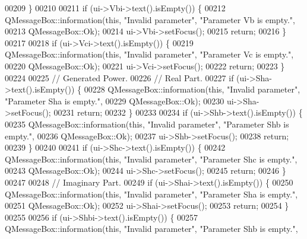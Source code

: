 \begin{DoxyCode}
00209   \}
00210 
00211   \textcolor{keywordflow}{if} (ui->Vbi->text().isEmpty()) \{
00212     QMessageBox::information(\textcolor{keyword}{this}, \textcolor{stringliteral}{"Invalid parameter"}, \textcolor{stringliteral}{"Parameter Vb is empty."},
00213                              QMessageBox::Ok);
00214     ui->Vbi->setFocus();
00215     \textcolor{keywordflow}{return};
00216   \}
00217 
00218   \textcolor{keywordflow}{if} (ui->Vci->text().isEmpty()) \{
00219     QMessageBox::information(\textcolor{keyword}{this}, \textcolor{stringliteral}{"Invalid parameter"}, \textcolor{stringliteral}{"Parameter Vc is empty."},
00220                              QMessageBox::Ok);
00221     ui->Vci->setFocus();
00222     \textcolor{keywordflow}{return};
00223   \}
00224 
00225   \textcolor{comment}{// Generated Power.}
00226   \textcolor{comment}{// Real Part.}
00227   \textcolor{keywordflow}{if} (ui->Sha->text().isEmpty()) \{
00228     QMessageBox::information(\textcolor{keyword}{this}, \textcolor{stringliteral}{"Invalid parameter"}, \textcolor{stringliteral}{"Parameter Sha is empty."},
00229                              QMessageBox::Ok);
00230     ui->Sha->setFocus();
00231     \textcolor{keywordflow}{return};
00232   \}
00233 
00234   \textcolor{keywordflow}{if} (ui->Shb->text().isEmpty()) \{
00235     QMessageBox::information(\textcolor{keyword}{this}, \textcolor{stringliteral}{"Invalid parameter"}, \textcolor{stringliteral}{"Parameter Shb is empty."},
00236                              QMessageBox::Ok);
00237     ui->Shb->setFocus();
00238     \textcolor{keywordflow}{return};
00239   \}
00240 
00241   \textcolor{keywordflow}{if} (ui->Shc->text().isEmpty()) \{
00242     QMessageBox::information(\textcolor{keyword}{this}, \textcolor{stringliteral}{"Invalid parameter"}, \textcolor{stringliteral}{"Parameter Shc is empty."},
00243                              QMessageBox::Ok);
00244     ui->Shc->setFocus();
00245     \textcolor{keywordflow}{return};
00246   \}
00247 
00248   \textcolor{comment}{// Imaginary Part.}
00249   \textcolor{keywordflow}{if} (ui->Shai->text().isEmpty()) \{
00250     QMessageBox::information(\textcolor{keyword}{this}, \textcolor{stringliteral}{"Invalid parameter"}, \textcolor{stringliteral}{"Parameter Sha is empty."},
00251                              QMessageBox::Ok);
00252     ui->Shai->setFocus();
00253     \textcolor{keywordflow}{return};
00254   \}
00255 
00256   \textcolor{keywordflow}{if} (ui->Shbi->text().isEmpty()) \{
00257     QMessageBox::information(\textcolor{keyword}{this}, \textcolor{stringliteral}{"Invalid parameter"}, \textcolor{stringliteral}{"Parameter Shb is empty."},

\end{DoxyCode}
